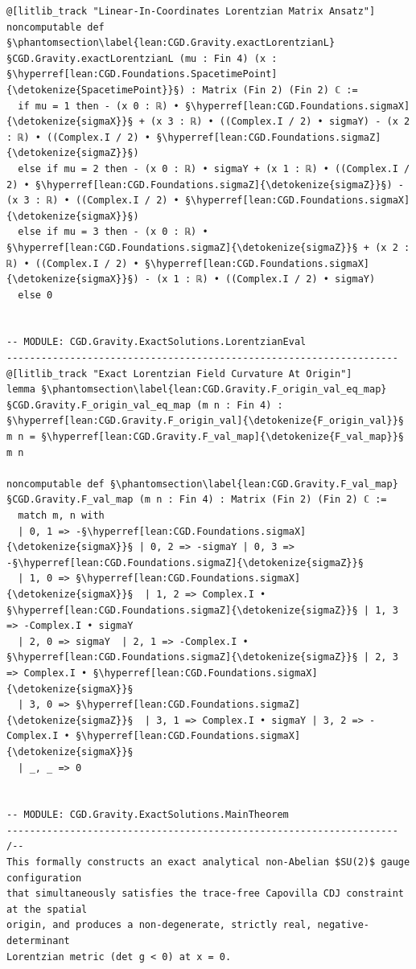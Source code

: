 \begin{verbatim}
@[litlib_track "Linear-In-Coordinates Lorentzian Matrix Ansatz"]
noncomputable def §\phantomsection\label{lean:CGD.Gravity.exactLorentzianL}§CGD.Gravity.exactLorentzianL (mu : Fin 4) (x : §\hyperref[lean:CGD.Foundations.SpacetimePoint]{\detokenize{SpacetimePoint}}§) : Matrix (Fin 2) (Fin 2) ℂ :=
  if mu = 1 then - (x 0 : ℝ) • §\hyperref[lean:CGD.Foundations.sigmaX]{\detokenize{sigmaX}}§ + (x 3 : ℝ) • ((Complex.I / 2) • sigmaY) - (x 2 : ℝ) • ((Complex.I / 2) • §\hyperref[lean:CGD.Foundations.sigmaZ]{\detokenize{sigmaZ}}§)
  else if mu = 2 then - (x 0 : ℝ) • sigmaY + (x 1 : ℝ) • ((Complex.I / 2) • §\hyperref[lean:CGD.Foundations.sigmaZ]{\detokenize{sigmaZ}}§) - (x 3 : ℝ) • ((Complex.I / 2) • §\hyperref[lean:CGD.Foundations.sigmaX]{\detokenize{sigmaX}}§)
  else if mu = 3 then - (x 0 : ℝ) • §\hyperref[lean:CGD.Foundations.sigmaZ]{\detokenize{sigmaZ}}§ + (x 2 : ℝ) • ((Complex.I / 2) • §\hyperref[lean:CGD.Foundations.sigmaX]{\detokenize{sigmaX}}§) - (x 1 : ℝ) • ((Complex.I / 2) • sigmaY)
  else 0


-- MODULE: CGD.Gravity.ExactSolutions.LorentzianEval
--------------------------------------------------------------------
@[litlib_track "Exact Lorentzian Field Curvature At Origin"]
lemma §\phantomsection\label{lean:CGD.Gravity.F_origin_val_eq_map}§CGD.Gravity.F_origin_val_eq_map (m n : Fin 4) : §\hyperref[lean:CGD.Gravity.F_origin_val]{\detokenize{F_origin_val}}§ m n = §\hyperref[lean:CGD.Gravity.F_val_map]{\detokenize{F_val_map}}§ m n

noncomputable def §\phantomsection\label{lean:CGD.Gravity.F_val_map}§CGD.Gravity.F_val_map (m n : Fin 4) : Matrix (Fin 2) (Fin 2) ℂ :=
  match m, n with
  | 0, 1 => -§\hyperref[lean:CGD.Foundations.sigmaX]{\detokenize{sigmaX}}§ | 0, 2 => -sigmaY | 0, 3 => -§\hyperref[lean:CGD.Foundations.sigmaZ]{\detokenize{sigmaZ}}§
  | 1, 0 => §\hyperref[lean:CGD.Foundations.sigmaX]{\detokenize{sigmaX}}§  | 1, 2 => Complex.I • §\hyperref[lean:CGD.Foundations.sigmaZ]{\detokenize{sigmaZ}}§ | 1, 3 => -Complex.I • sigmaY
  | 2, 0 => sigmaY  | 2, 1 => -Complex.I • §\hyperref[lean:CGD.Foundations.sigmaZ]{\detokenize{sigmaZ}}§ | 2, 3 => Complex.I • §\hyperref[lean:CGD.Foundations.sigmaX]{\detokenize{sigmaX}}§
  | 3, 0 => §\hyperref[lean:CGD.Foundations.sigmaZ]{\detokenize{sigmaZ}}§  | 3, 1 => Complex.I • sigmaY | 3, 2 => -Complex.I • §\hyperref[lean:CGD.Foundations.sigmaX]{\detokenize{sigmaX}}§
  | _, _ => 0


-- MODULE: CGD.Gravity.ExactSolutions.MainTheorem
--------------------------------------------------------------------
/--
This formally constructs an exact analytical non-Abelian $SU(2)$ gauge configuration
that simultaneously satisfies the trace-free Capovilla CDJ constraint at the spatial
origin, and produces a non-degenerate, strictly real, negative-determinant
Lorentzian metric (det g < 0) at x = 0.


\end{verbatim}
